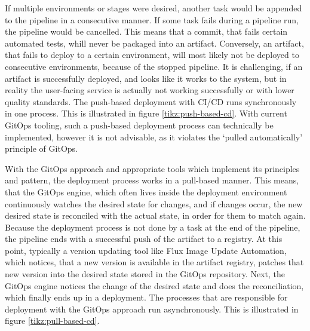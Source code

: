 If multiple environments or stages were desired,
another task would be appended to the pipeline
in a consecutive manner.
If some task fails during a pipeline run,
the pipeline would be cancelled.
This means that a commit, that fails certain automated tests,
whill never be packaged into an artifact.
Conversely, an artifact, that fails to deploy to a certain environment,
will most likely not be deployed to consecutive environments, because of the stopped pipeline.
It is challenging, if an artifact is successfully deployed,
and looks like it works to the system,
but in reality the user-facing service is actually not working successfully or with lower quality standards.
The push-based deployment with CI/CD runs synchronously in one process.
This is illustrated in figure \ref{tikz:push-based-cd}.
With current GitOps tooling,
such a push-based deployment process can technically be implemented,
however it is not advisable, as it violates the \enquote*{pulled automatically} principle of GitOps.




With the GitOps approach and appropriate tools which implement its principles and pattern,
the deployment process works in a pull-based manner.
This means, that the GitOps engine, which often lives inside the deployment environment
continuously watches the desired state for changes,
and if changes occur, the new desired state is reconciled with the actual state, in order for them to match again.
Because the deployment process is not done by a task at the end of the pipeline,
the pipeline ends with a successful push of the artifact to a registry.
At this point, typically a version updating tool like Flux Image Update Automation, which notices, that a new version is available in
the artifact registry, patches that new version into the desired state stored in the GitOps repository.
Next, the GitOps engine notices the change of the desired state and does the reconciliation,
which finally ends up in a deployment.
The processes that are responsible for deployment with the GitOps approach run asynchronously.
This is illustrated in figure \ref{tikz:pull-based-cd}.








